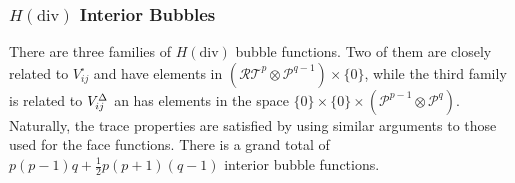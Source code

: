 %

\subsubsection{\texorpdfstring{$H(\mathrm{div})$}{Hdiv} Interior Bubbles}

There are three families of $H(\mathrm{div})$ bubble functions. 
Two of them are closely related to $V_{ij}^\square$ and have elements in $(\mathcal{RT}^p\otimes\mathcal{P}^{q-1})\times\{0\}$, while the third family is related to $V_{ij}^\Delta$ an has elements in the space $\{0\}\times\{0\}\times(\mathcal{P}^{p-1}\otimes\mathcal{P}^q)$.
Naturally, the trace properties are satisfied by using similar arguments to those used for the face functions. 
There is a grand total of $p(p-1)q+\frac{1}{2}p(p+1)(q-1)$ interior bubble functions.


